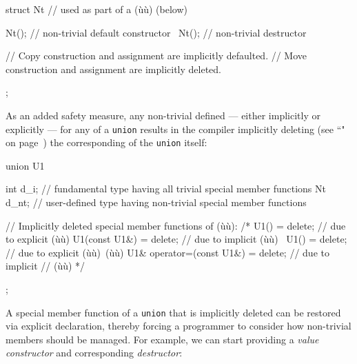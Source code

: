 \begin{emcppslisting}[emcppsbatch=e2]
struct Nt  // used as part of a (ù{}ù) (below)
{
    Nt();   // non-trivial default constructor
    ~Nt();  // non-trivial destructor

    // Copy construction and assignment are implicitly defaulted.
    // Move construction and assignment are implicitly deleted.
};
\end{emcppslisting}

\noindent As an added safety measure, any non-trivial  defined --- either implicitly or explicitly --- for any
 of a \lstinline!union! results in the compiler implicitly
deleting (see %
``" on page~\pageref{deleted-functions}) the corresponding  of the \lstinline!union! itself:

\begin{emcppslisting}[emcppsbatch=e2]
union U1
{
    int d_i;   // fundamental type having all trivial special member functions
    Nt  d_nt;  // user-defined type having non-trivial special member functions

    // Implicitly deleted special member functions of (ù{}ù):
    /*
        U1()                     = delete; // due to explicit (ù{}ù)
        U1(const U1&)            = delete; // due to implicit (ù{}ù)
        ~U1()                    = delete; // due to explicit (ù{}ù)~(ù{}ù)
        U1& operator=(const U1&) = delete; // due to implicit
                                           // (ù{}ù)
    */
};
\end{emcppslisting}


A special member function of a \lstinline!union! that is implicitly deleted
can be restored via explicit declaration, thereby forcing a programmer
to consider how non-trivial members should be managed. For example,
we can start providing a \emph{value constructor} and corresponding
\emph{destructor}:

